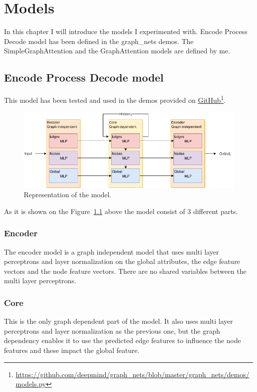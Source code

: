 \chapter{Models}\label{sect:Models}
In this chapter I will introduce the models I experimented with. Encode Process Decode model has been defined in the graph\_nets demos. The SimpleGraphAttention and the GraphAttention models are defined by me.

\section{Encode Process Decode model}
This model has been tested and used in the demos provided on \href{https://github.com/deepmind/graph_nets/blob/master/graph_nets/demos/models.py}{GitHub}\footnote{\url{https://github.com/deepmind/graph_nets/blob/master/graph_nets/demos/models.py}}.
\begin{figure}[!ht]
	\centering
	\includegraphics[width=150mm, keepaspectratio]{figures/EPD.png}
	\caption{Representation of the model.}
	\label{fig:encode-process-decode}
\end{figure}

As it is shown on the Figure~\ref{fig:encode-process-decode} above the model consist of 3 different parts.

\subsection{Encoder}
The encoder model is a graph independent model that uses multi layer perceptrons and layer normalization on the global attributes, the edge feature vectors and the node feature vectors. There are no shared variables between the multi layer perceptrons.

\subsection{Core}
This is the only graph dependent part of the model. It also uses multi layer perceptrons and layer normalization as the previous one, but the graph dependency enables it to use the predicted edge features to influence the node features and these impact the global feature.

